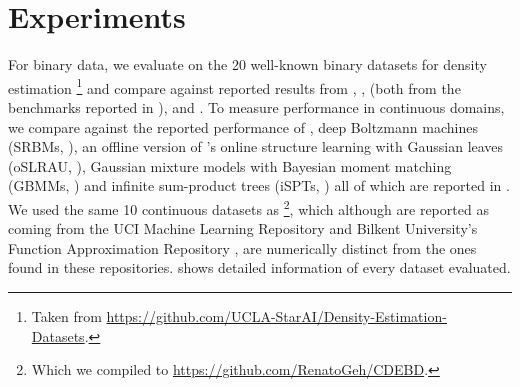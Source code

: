 \section{Experiments}

For binary data, we evaluate  on the 20 well-known binary datasets for density
estimation \citep{lowd10,haaren12}\footnote{Taken from
\url{https://github.com/UCLA-StarAI/Density-Estimation-Datasets}.} and compare against reported
results from  \citep{gens13}, ,  (both
from the benchmarks reported in \cite{dang20}),  \citep{jaini18a} and
 \citep{dimauro21}. To measure performance in continuous domains, we compare
 against the reported performance of , deep Boltzmann
machines (SRBMs, \cite{salakhutdinov09}), an offline version of \citeauthor{hsu17}'s online
structure learning with Gaussian leaves (oSLRAU, \cite{hsu17}), Gaussian mixture models with
Bayesian moment matching (GBMMs, \cite{jaini16}) and infinite sum-product trees (iSPTs,
\cite{trapp16}) all of which are reported in \citet{jaini18a}. We used the same 10 continuous
datasets as \citet{jaini18a}\footnote{Which we compiled to
\url{https://github.com/RenatoGeh/CDEBD}.}, which although are reported as coming from the UCI
Machine Learning Repository \citep{dua17} and Bilkent University's Function Approximation
Repository \citep{guvenir00}, are numerically distinct from the ones found in these repositories.
 shows detailed information of every dataset evaluated.

